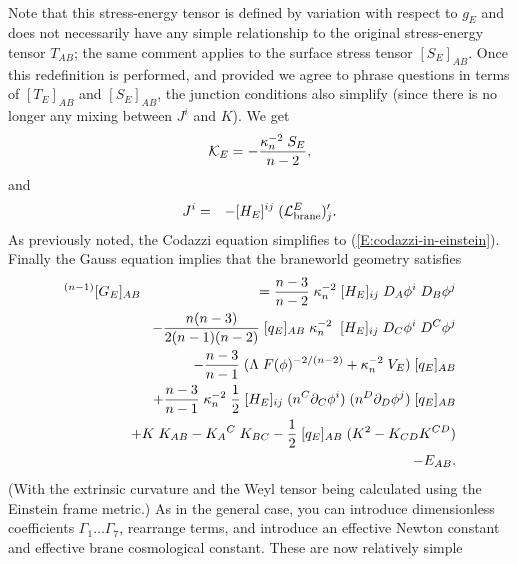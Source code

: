 \documentclass[a4paper,10pt]{article}
\begin{document}
{\begin{eqnarray}
\end{eqnarray}
%
Note that this stress-energy tensor is defined by variation with
respect to $g_E$ and does not necessarily have any simple relationship
to the original stress-energy tensor $T_{AB}$; the same comment
applies to the surface stress tensor $[S_E]_{AB}$.  Once this
redefinition is performed, and provided we agree to phrase questions
in terms of $[T_E]_{AB}$ and $[S_E]_{AB}$, the junction conditions
also simplify (since there is no longer any mixing between $J^i$ and
$K$). We get
%
\begin{equation}
{\mathcal K}_E= -{\kappa_n^{-2} \; S_E\over n-2},
\end{equation}
%
and
%
\begin{eqnarray} 
J^i &=& - [H_E]^{ij} \; ({\mathcal L}_{\mathrm{brane}}^E)'_j.
\end{eqnarray} 
%
As previously noted, the Codazzi equation simplifies to
(\ref{E:codazzi-in-einstein}). Finally the Gauss equation implies that
the braneworld geometry satisfies
%
\begin{eqnarray}
{}^{(n-1)}[G_E]_{AB}
&&\hspace{-6mm}
=
{n-3 \over n-2} \;\kappa_n^{-2}\;[H_E]_{ij}\; D_A \phi^i \; D_B \phi^j 
\nonumber \\
&&\hspace{-6mm}
- 
{n(n-3) \over 2(n-1)(n-2)} \; [q_E]_{AB} \; \kappa_n^{-2}\;\; 
[H_E]_{ij} \;D_C \phi^i \; D^C \phi^j 
\nonumber \\
&&\hspace{-6mm}
-
{n-3 \over n-1} \;(\Lambda\;  F(\phi)^{-2/(n-2)} + \kappa_n^{-2} \; V_E) \; [q_E]_{AB} 
\nonumber \\
&&\hspace{-6mm}
+ 
{n-3 \over n-1} \; \kappa_n^{-2}\; {1\over2} \;[H_E]_{ij} \;
(n^C\partial_C \phi^i) \; (n^D\partial_D \phi^j) \; [q_E]_{AB}
\nonumber \\
&&\hspace{-6mm}
+
K\;K_{AB}-K_{A}{}^{C} \; K_{BC} 
- {1 \over 2} \; [q_E]_{AB}\;( K^2- K_{CD} K^{CD}) 
\nonumber \\
&&\hspace{-6mm}
-E_{AB}.
\label{E:brane-einstein-einstein-frame}
\end{eqnarray}
%
(With the extrinsic curvature and the Weyl tensor being calculated
using the Einstein frame metric.)  As in the general case, you can
introduce dimensionless coefficients $\Gamma_1\dots\Gamma_7$,
rearrange terms, and introduce an effective Newton constant and
effective brane cosmological constant. These are now relatively simple
}
\end{document}
